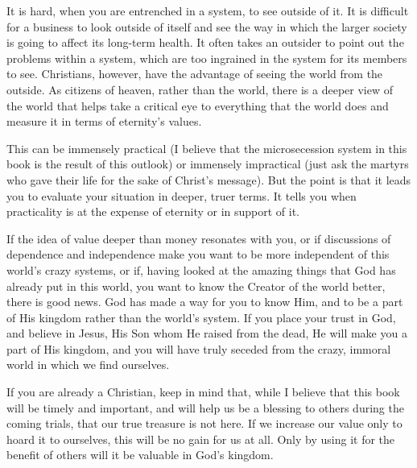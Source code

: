 It is hard, when you are entrenched in a system, to see outside of it.
It is difficult for a business to look outside of itself and see the
way in which the larger society is going to affect its long-term
health. It often takes an outsider to point out the problems within a
system, which are too ingrained in the system for its members to see.
Christians, however, have the advantage of seeing the world from the
outside. As citizens of heaven, rather than the world, there is a
deeper view of the world that helps take a critical eye to everything
that the world does and measure it in terms of eternity's values.

This can be immensely practical (I believe that the microsecession
system in this book is the result of this outlook) or immensely
impractical (just ask the martyrs who gave their life for the sake of
Christ's message). But the point is that it leads you
to evaluate your situation in deeper, truer terms. It tells you when
practicality is at the expense of eternity or in support of it. 

If the idea of value deeper than money resonates with you, or if
discussions of dependence and independence make you want to be more
independent of this world's crazy systems, or if,
having looked at the amazing things that God has already put in this
world, you want to know the Creator of the world better, there is good
news. God has made a way for you to know Him, and to be a part of His
kingdom rather than the world's system. If you place
your trust in God, and believe in Jesus, His Son whom He raised from
the dead, He will make you a part of His kingdom, and you will have
truly seceded from the crazy, immoral world in which we find
ourselves.

If you are already a Christian, keep in mind that, while I believe that
this book will be timely and important, and will help us be a blessing
to others during the coming trials, that our true treasure is not here.
If we increase our value only to hoard it to ourselves, this will be no
gain for us at all.  Only by using it for the benefit of others will it
be valuable in God's kingdom.
